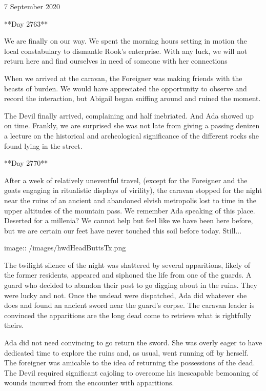 7 September 2020

**Day 2763**


We are finally on our way.  We spent the morning hours setting in motion the local constabulary to dismantle Rook’s enterprise.  With any luck, we will not return here and find ourselves in need of someone with her connections

When we arrived at the caravan, the Foreigner was making friends with the beasts of burden.  We would have appreciated the opportunity to observe and record the interaction, but Abigail began sniffing around and ruined the moment.

The Devil finally arrived, complaining and half inebriated.  And Ada showed up on time.  Frankly, we are surprised she was not late from giving a passing denizen a lecture on the historical and archeological significance of the different rocks she found lying in the street.


**Day 2770**


After a week of relatively uneventful travel, (except for the Foreigner and the goats engaging in ritualistic displays of virility), the caravan stopped for the night near the ruins of an ancient and abandoned elvish metropolis lost to time in the upper altitudes of the mountain pass.  We remember Ada speaking of this place.  Deserted for a millenia?  We cannot help but feel like we have been here before, but we are certain our feet have never touched this soil before today.  Still...

image:: /images/hwdHeadButtsTx.png


The twilight silence of the night was shattered by several apparitions, likely of the former residents, appeared and siphoned the life from one of the guards.  A guard who decided to abandon their post to go digging about in the ruins.  They were lucky and not.  Once the undead were dispatched, Ada did whatever she does and found an ancient sword near the guard’s corpse.  The caravan leader is convinced the apparitions are the long dead come to retrieve what is rightfully theirs.

Ada did not need convincing to go return the sword.  She was overly eager to have dedicated time to explore the ruins and, as usual, went running off by herself.  The foreigner was amicable to the idea of returning the possessions of the dead.  The Devil required significant cajoling to overcome his inescapable bemoaning of wounds incurred from the encounter with apparitions.

